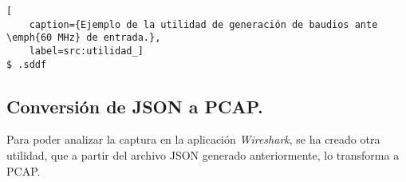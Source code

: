 \begin{lstlisting}[
    caption={Ejemplo de la utilidad de generación de baudios ante \emph{60 MHz} de entrada.},
    label=src:utilidad_]
$ .sddf
\end{lstlisting}


\subsection{Conversión de JSON a PCAP.}
Para poder analizar la captura en la aplicación \emph{Wireshark}, se ha creado otra utilidad, que a partir del archivo JSON generado anteriormente, lo transforma a PCAP.







